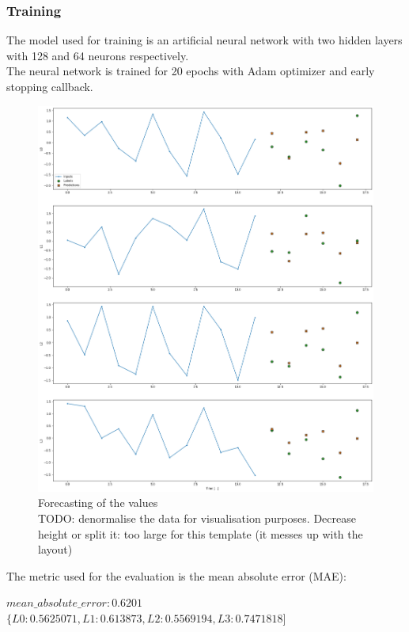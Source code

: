 \subsubsection{Training}
The model used for training is an artificial neural network with two hidden layers with 128 and 64 neurons respectively.\\
The neural network is trained for 20 epochs with Adam optimizer and early stopping callback.

\begin{figure}[H]
    \centering
    \includegraphics[width=.9\linewidth]{images/GYM-ANM/DATASET PLOTS/lines_forecasting.png}
    \caption[GYM-ANM forecasting]{Forecasting of the values \\
    TODO: denormalise the data for visualisation purposes. Decrease height or split it: too large for this template (it messes up with the layout)}
    \label{fig:net_sit3}
\end{figure}

\noindent The metric used for the evaluation is the mean absolute error (\gls{MAE}):
\begin{algorithmic}
\State $mean\_absolute\_error: 0.6201$
\State $\{L0:0.5625071, L1:0.613873 , L2:0.5569194, L3:0.7471818]$
\end{algorithmic}

